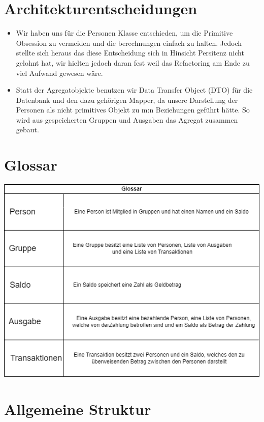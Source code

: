 \documentclass[
]{article}
\begin{document}
\hypertarget{section-design-decisions}{%
\section{Architekturentscheidungen}\label{section-design-decisions}}
\begin {itemize} 
\item Wir haben uns für die Personen Klasse entschieden, um die Primitive Obsession zu vermeiden und die berechnungen einfach zu halten. Jedoch stellte sich heraus das diese Entscheidung sich in Hinsicht Persitenz nicht gelohnt hat, wir hielten jedoch daran fest weil das Refactoring am Ende zu viel Aufwand gewesen wäre.
\item Statt der Agregatobjekte benutzen wir Data Transfer Object (DTO) für die Datenbank und den dazu gehörigen Mapper, da unsere Darstellung der Personen als nicht primitives Objekt zu m:n Beziehungen geführt hätte. So wird aus gespeicherten Gruppen und Ausgaben das Agregat zusammen gebaut.
\end {itemize}



\hypertarget{section-design-decisions}{%
\section{Glossar}\label{section-design-decisions}}

\includegraphics{GlossarFertigFr}

\hypertarget{section-design-decisions}{%
\section{Allgemeine Struktur}\label{section-design-decisions}}
\end{document}
